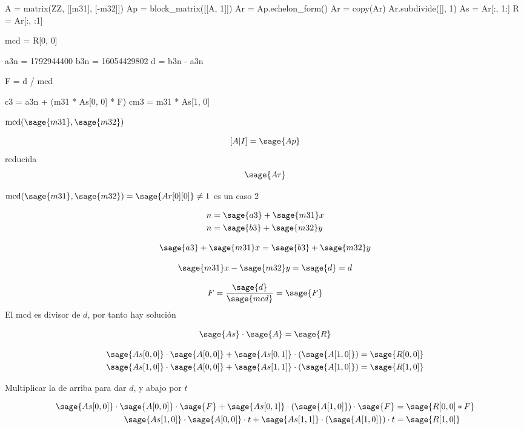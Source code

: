 \documentclass{amsart}
\begin{document}

\begin{sageblock}
	A = matrix(ZZ, [[m31], [-m32]])
	Ap = block_matrix([[A, 1]])
	Ar = Ap.echelon_form()
	Ar = copy(Ar)
	Ar.subdivide([], 1)
	As = Ar[:, 1:]
	R = Ar[:, :1]
	
	mcd = R[0, 0]
	
	a3n = 1792944400
	b3n = 16054429802
	d = b3n - a3n
	
	F = d / mcd
	
	c3 = a3n + (m31 * As[0, 0] * F)
	cm3 = m31 * As[1, 0]
\end{sageblock}

$\text{mcd}(\sage{m31}, \sage{m32})$


$$
	[A|I] = \sage{Ap}
$$
reducida
$$
	\sage{Ar}
$$

$\text{mcd}(\sage{m31}, \sage{m32}) = \sage{Ar[0][0]} \not= 1$ es un caso 2

\begin{align*}
	n &= \sage{a3} + \sage{m31} x \\
	n &= \sage{b3} + \sage{m32} y \\
\end{align*}

$$
	\sage{a3} + \sage{m31} x = \sage{b3} + \sage{m32} y
$$

$$
	\sage{m31} x - \sage{m32} y = \sage{d} = d
$$

$$
	F = \frac{\sage{d}}{\sage{mcd}} = \sage{F}
$$
El mcd es divisor de $d$, por tanto hay solución

$$
	\sage{As} \cdot \sage{A} = \sage{R}
$$

\begin{align*}
	\sage{As[0, 0]} \cdot \sage{A[0, 0]} + \sage{As[0, 1]} \cdot (\sage{A[1, 0]}) &= \sage{R[0, 0]} \\
	\sage{As[1, 0]} \cdot \sage{A[0, 0]} + \sage{As[1, 1]} \cdot (\sage{A[1, 0]}) &= \sage{R[1, 0]} \\
\end{align*}

Multiplicar la de arriba para dar $d$, y abajo por $t$

\begin{align*}
	\sage{As[0, 0]} \cdot \sage{A[0, 0]} \cdot \sage{F} + \sage{As[0, 1]} \cdot (\sage{A[1, 0]}) \cdot \sage{F} &= \sage{R[0, 0] * F} \\
	\sage{As[1, 0]} \cdot \sage{A[0, 0]} \cdot t + \sage{As[1, 1]} \cdot (\sage{A[1, 0]}) \cdot t &= \sage{R[1, 0]} \\
\end{align*}
\end{document}
